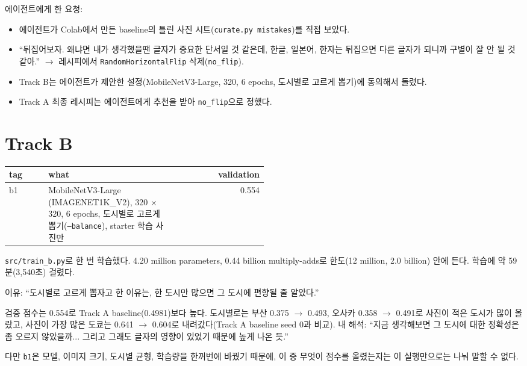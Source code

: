 \documentclass[11pt]{article}
\begin{document}
에이전트에게 한 요청:
\begin{itemize}
\item 에이전트가 Colab에서 만든 baseline의 틀린 사진 시트(\texttt{curate.py mistakes})를 직접 보았다.
\item ``뒤집어보자. 왜냐면 내가 생각했을땐 글자가 중요한 단서일 것 같은데, 한글, 일본어,
  한자는 뒤집으면 다른 글자가 되니까 구별이 잘 안 될 것 같아.'' $\rightarrow$ 레시피에서
  \texttt{RandomHorizontalFlip} 삭제(\texttt{no\_flip}).
\item Track B는 에이전트가 제안한 설정(MobileNetV3-Large, 320, 6 epochs, 도시별로 고르게 뽑기)에
  동의해서 돌렸다.
\item Track A 최종 레시피는 에이전트에게 추천을 받아 \texttt{no\_flip}으로 정했다.
\end{itemize}

\section*{Track B}

\begin{center}\footnotesize
\begin{tabular}{lp{0.5\linewidth}r}
\toprule
tag & what & validation \\
\midrule
b1 & MobileNetV3-Large (IMAGENET1K\_V2), 320 $\times$ 320, 6 epochs, 도시별로 고르게 뽑기(\texttt{--balance}), starter 학습 사진만 & 0.554 \\
\bottomrule
\end{tabular}
\end{center}

\texttt{src/train\_b.py}로 한 번 학습했다. 4.20 million parameters, 0.44 billion multiply-adds로
한도(12 million, 2.0 billion) 안에 든다. 학습에 약 59분(3,540초) 걸렸다.

이유: ``도시별로 고르게 뽑자고 한 이유는, 한 도시만 많으면 그 도시에 편향될 줄 알았다.''

검증 점수는 0.554로 Track A baseline(0.4981)보다 높다. 도시별로는 부산 0.375 $\rightarrow$ 0.493,
오사카 0.358 $\rightarrow$ 0.491로 사진이 적은 도시가 많이 올랐고, 사진이 가장 많은 도쿄는
0.641 $\rightarrow$ 0.604로 내려갔다(Track A baseline seed 0과 비교).
내 해석: ``지금 생각해보면 그 도시에 대한 정확성은 좀 오르지 않았을까... 그리고 그래도 글자의
영향이 있었기 때문에 높게 나온 듯.''

다만 \texttt{b1}은 모델, 이미지 크기, 도시별 균형, 학습량을 한꺼번에 바꿨기 때문에, 이 중 무엇이
점수를 올렸는지는 이 실행만으로는 나눠 말할 수 없다.
\end{document}
